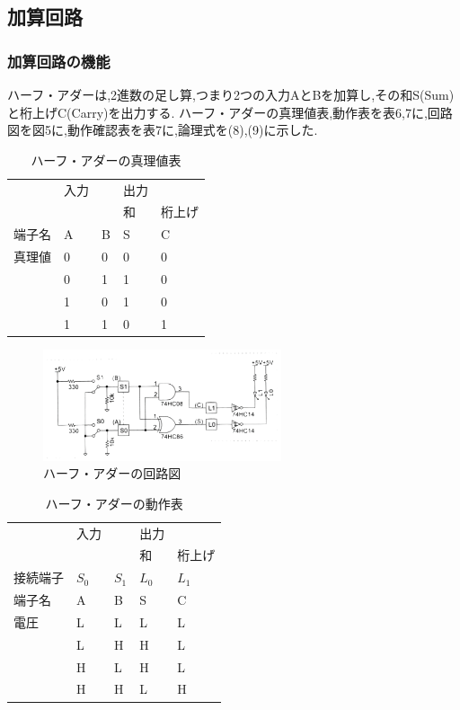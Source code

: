 \documentclass[twocolumn, 10pt,a4j]{jsarticle}
\begin{document}
\subsection{加算回路}
  \subsubsection{加算回路の機能}
    ハーフ・アダーは,2進数の足し算,つまり2つの入力AとBを加算し,その和S(Sum)と桁上げC(Carry)を出力する.
    ハーフ・アダーの真理値表,動作表を表6,7に,回路図を図5に,動作確認表を表7に,論理式を(8),(9)に示した.
    \begin{table}[]
      \centering
      \caption{ハーフ・アダーの真理値表}
      \label{my-label}
      \begin{tabular}{l|ll|ll|}
          & 入力 &   & 出力 &     \\ \cline{4-5} 
          &  &   & 和  & 桁上げ \\ \hline
      端子名 & A  & B & S  & C   \\ \hline
      真理値 & 0  & 0 & 0  & 0   \\
          & 0  & 1 & 1  & 0   \\
          & 1  & 0 & 1  & 0   \\
          & 1  & 1 & 0  & 1  
      \end{tabular}
    \end{table}
    \begin{figure}[H]
      \begin{center}
        \includegraphics[width=7cm]{../img/half_adder/half_ader_kairo.png}
        \caption{ハーフ・アダーの回路図}
      \end{center}
    \end{figure}
    \begin{table}[H]
      \centering
      \caption{ハーフ・アダーの動作表}
      \label{my-label}
        \begin{tabular}{l|ll|ll|}
            & 入力      &         & 出力      &         \\ \cline{4-5} 
            &         &         & 和       & 桁上げ     \\ \hline
        接続端子 & $S_{0}$ & $S_{1}$ & $L_{0}$ & $L_{1}$ \\ \hline
        端子名  & A       & B       & S       & C       \\ \hline
        電圧   & L       & L       & L       & L       \\
            & L       & H       & H       & L       \\
            & H       & L       & H       & L       \\
            & H       & H       & L       & H      
        \end{tabular}
    \end{table}
\end{document}
